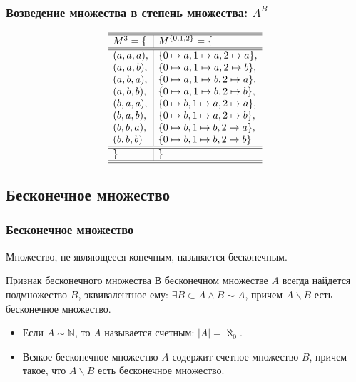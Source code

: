 \begin{frame}
    \frametitle{Возведение множества в степень множества: $A^B$}
    
    \begin{example}[$M=\{a,b\}$. $M^3\sim M^{\{0,1,2\}}$]
        \[
        \begin{array}{l|l}
            \hline\hline
            M^3 = \{      & M^{\{0,1,2\}}=\{              \\ \hline\hline
            (a,a,a),    & \{0\mapsto a, 1\mapsto a, 2\mapsto a\}, \\
            (a,a,b),    & \{0\mapsto a, 1\mapsto a, 2\mapsto b\}, \\
            (a,b,a),    & \{0\mapsto a, 1\mapsto b, 2\mapsto a\}, \\
            (a,b,b),    & \{0\mapsto a, 1\mapsto b, 2\mapsto b\}, \\
            (b,a,a),    & \{0\mapsto b, 1\mapsto a, 2\mapsto a\}, \\
            (b,a,b),    & \{0\mapsto b, 1\mapsto a, 2\mapsto b\}, \\
            (b,b,a),    & \{0\mapsto b, 1\mapsto b, 2\mapsto a\}, \\
            (b,b,b)     & \{0\mapsto b, 1\mapsto b, 2\mapsto b\}  \\ \hline\hline
            \}            & \} \\ \hline\hline
        \end{array}
        \]
    \end{example}
\end{frame}


\subsection{Бесконечное множество}

\begin{frame}
    \frametitle{Бесконечное множество}
    
    \begin{definition}
        Множество, не являющееся конечным, называется \alert{бесконечным}. 
    \end{definition}

    \begin{block}{Признак бесконечного множества}
        В бесконечном множестве $A$ всегда найдется подмножество $B$, эквивалентное ему: $\exists B\subset A\land B\sim A$, причем $A\backslash B$ есть бесконечное множество.
    \end{block}
    
    \begin{itemize}
        \item Если $A\sim \mathbb{N}$, то $A$ называется \alert{счетным}: $|A|=\aleph_0$.

        \item Всякое бесконечное множество $A$ содержит счетное множество $B$, причем такое, что $A\backslash B$ есть бесконечное множество.
    \end{itemize}
\end{frame}

